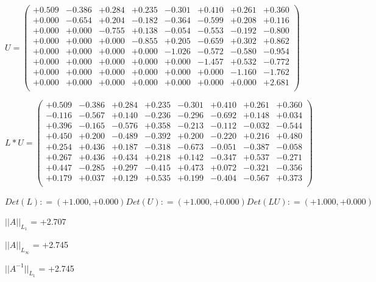 \documentclass[9pt]{article}
\theoremstyle{plain}
\theoremstyle{definition}
\theoremstyle{remark}
\numberwithin{equation}{section}
\begin{document}
$U = \left(
\begin{array}{
cccccccc}
+0.509 & -0.386 & +0.284 & +0.235 & -0.301 & +0.410 & +0.261 & +0.360 \\
+0.000 & -0.654 & +0.204 & -0.182 & -0.364 & -0.599 & +0.208 & +0.116 \\
+0.000 & +0.000 & -0.755 & +0.138 & -0.054 & -0.553 & -0.192 & -0.800 \\
+0.000 & +0.000 & +0.000 & -0.855 & +0.205 & -0.659 & +0.302 & +0.862 \\
+0.000 & +0.000 & +0.000 & +0.000 & -1.026 & -0.572 & -0.580 & -0.954 \\
+0.000 & +0.000 & +0.000 & +0.000 & +0.000 & -1.457 & +0.532 & -0.772 \\
+0.000 & +0.000 & +0.000 & +0.000 & +0.000 & +0.000 & -1.160 & -1.762 \\
+0.000 & +0.000 & +0.000 & +0.000 & +0.000 & +0.000 & +0.000 & +2.681 \\
\end{array}
\right)$ \newline 

$L * U  = \left(
\begin{array}{
cccccccc}
+0.509 & -0.386 & +0.284 & +0.235 & -0.301 & +0.410 & +0.261 & +0.360 \\
-0.116 & -0.567 & +0.140 & -0.236 & -0.296 & -0.692 & +0.148 & +0.034 \\
+0.396 & -0.165 & -0.576 & +0.358 & -0.213 & -0.112 & -0.032 & -0.544 \\
+0.450 & +0.200 & -0.489 & -0.392 & +0.200 & -0.220 & +0.216 & +0.480 \\
+0.254 & +0.436 & +0.187 & -0.318 & -0.673 & -0.051 & -0.387 & -0.058 \\
+0.267 & +0.436 & +0.434 & +0.218 & +0.142 & -0.347 & +0.537 & -0.271 \\
+0.447 & -0.285 & +0.297 & -0.415 & +0.473 & +0.072 & -0.321 & -0.356 \\
+0.179 & +0.037 & +0.129 & +0.535 & +0.199 & -0.404 & -0.567 & +0.373 \\
\end{array}
\right)$ \newline 

$Det(L) :    = (+1.000,+0.000)     Det(U) :    = (+1.000,+0.000)     Det(LU) :    = (+1.000,+0.000)$

$||A||_{L_1}$  = +2.707

$||A||_{L_{\infty}}$ = +2.745

$||A^{-1}||_{L_1}$  = +2.745
\end{document}
